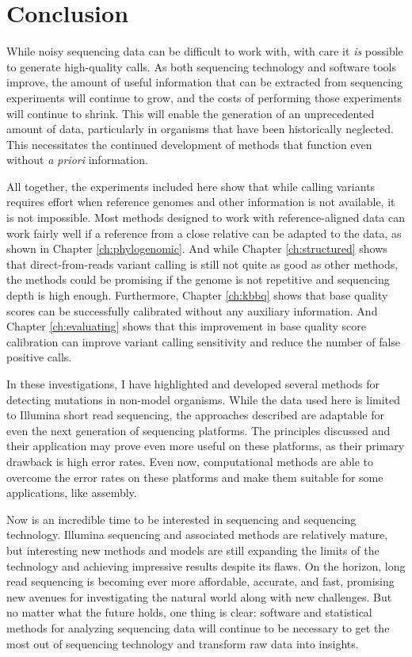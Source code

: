 \chapter{Conclusion}

While noisy sequencing data can be difficult to work with, with care it \textit{is} possible to generate high-quality calls. As both sequencing technology and software tools improve, the amount of useful information that can be extracted from sequencing experiments will continue to grow, and the costs of performing those experiments will continue to shrink. This will enable the generation of an unprecedented amount of data, particularly in organisms that have been historically neglected. This necessitates the continued development of methods that function even without \textit{a priori} information.

All together, the experiments included here show that while calling variants requires effort when reference genomes and other information is not available, it is not impossible. Most methods designed to work with reference-aligned data can work fairly well if a reference from a close relative can be adapted to the data, as shown in Chapter \ref{ch:phylogenomic}. And while Chapter \ref{ch:structured} shows that direct-from-reads variant calling is still not quite as good as other methods, the methods could be promising if the genome is not repetitive and sequencing depth is high enough. Furthermore, Chapter \ref{ch:kbbq} shows that base quality scores can be successfully calibrated without any auxiliary information. And Chapter \ref{ch:evaluating} shows that this improvement in base quality score calibration can improve variant calling sensitivity and reduce the number of false positive calls.

In these investigations, I have highlighted and developed several methods for detecting mutations in non-model organisms. While the data used here is limited to Illumina short read sequencing, the approaches described are adaptable for even the next generation of sequencing platforms. The principles discussed and their application may prove even more useful on these platforms, as their primary drawback is high error rates. Even now, computational methods are able to overcome the error rates on these platforms and make them suitable for some applications, like assembly.

Now is an incredible time to be interested in sequencing and sequencing technology. Illumina sequencing and associated methods are relatively mature, but interesting new methods and models are still expanding the limits of the technology and achieving impressive results despite its flaws. On the horizon, long read sequencing is becoming ever more affordable, accurate, and fast, promising new avenues for investigating the natural world along with new challenges. But no matter what the future holds, one thing is clear: software and statistical methods for analyzing sequencing data will continue to be necessary to get the most out of sequencing technology and transform raw data into insights.



